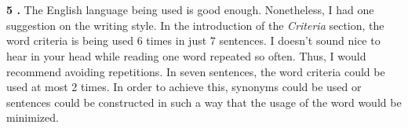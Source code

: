 \documentclass{article}
\begin{document}
    \section*{}
    \textbf{5 .} The English language being used is good enough. Nonetheless, I had one suggestion on the writing style. In the introduction of the \textit{Criteria} section, the word criteria is being used 6 times in just 7 sentences. I doesn't sound nice to hear in your head while reading one word repeated so often. Thus, I would recommend avoiding repetitions. In seven sentences, the word criteria could be used at most 2 times. In order to achieve this, synonyms could be used or sentences could be constructed in such a way that the usage of the word would be minimized.    
    
\end{document}
